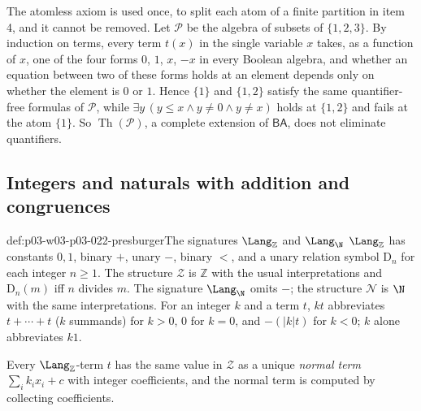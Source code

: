 The atomless axiom is used once, to split each atom of a finite partition
in item 4, and it cannot be removed. Let \(\mathcal P\) be the algebra of
subsets of \(\{1,2,3\}\). By induction on terms, every term \(t(x)\) in the
single variable \(x\) takes, as a function of \(x\), one of the four forms
\(0\), \(1\), \(x\), \(-x\) in every Boolean algebra, and whether an equation
between two of these forms holds at an element depends only on whether the
element is \(0\) or \(1\). Hence \(\{1\}\) and \(\{1,2\}\) satisfy the same
quantifier-free formulas of \(\mathcal P\), while
\(\exists y\,(y\le x\land y\ne0\land y\ne x)\) holds at \(\{1,2\}\) and
fails at the atom \(\{1\}\). So \(\operatorname{Th}(\mathcal P)\), a complete
extension of \(\mathsf{BA}\), does not eliminate quantifiers.

\subsection{Integers and naturals with addition and congruences}

\begin{hbdefinition}{def:p03-w03-p03-022-presburger}{The signatures \(\Lang_{\mathbb Z}\) and \(\Lang_{\N}\)}
\(\Lang_{\mathbb Z}\) has constants \(0,1\), binary \(+\), unary \(-\), binary
\(<\), and a unary relation symbol \(\mathrm D_n\) for each integer
\(n\ge1\). The structure \(\mathcal Z\) is \(\mathbb Z\) with the usual
interpretations and \(\mathrm D_n(m)\) iff \(n\) divides \(m\). The signature
\(\Lang_{\N}\) omits \(-\); the structure \(\mathcal N\) is \(\N\) with the
same interpretations. For an integer \(k\) and a term \(t\), \(kt\)
abbreviates \(t+\cdots+t\) (\(k\) summands) for \(k>0\), \(0\) for
\(k=0\), and \(-(|k|t)\) for \(k<0\); \(k\) alone abbreviates \(k1\).
\end{hbdefinition}

Every \(\Lang_{\mathbb Z}\)-term \(t\) has the same value in \(\mathcal Z\) as
a unique \emph{normal term} \(\sum_ik_ix_i+c\) with integer coefficients,
and the normal term is computed by collecting coefficients.

